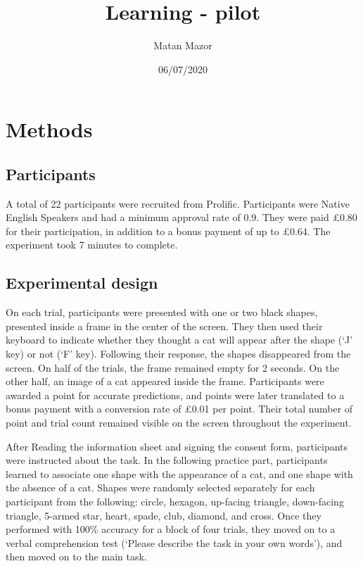 \documentclass[
]{article}
\title{Learning - pilot}
\author{Matan Mazor}
\date{06/07/2020}
\begin{document}
\maketitle

\hypertarget{methods}{%
\section{Methods}\label{methods}}

\hypertarget{participants}{%
\subsection{Participants}\label{participants}}

A total of 22 participants were recruited from Prolific. Participants
were Native English Speakers and had a minimum approval rate of 0.9.
They were paid £0.80 for their participation, in addition to a bonus
payment of up to £0.64. The experiment took 7 minutes to complete.

\hypertarget{experimental-design}{%
\subsection{Experimental design}\label{experimental-design}}

On each trial, participants were presented with one or two black shapes,
presented inside a frame in the center of the screen. They then used
their keyboard to indicate whether they thought a cat will appear after
the shape (`J' key) or not (`F' key). Following their response, the
shapes disappeared from the screen. On half of the trials, the frame
remained empty for 2 seconds. On the other half, an image of a cat
appeared inside the frame. Participants were awarded a point for
accurate predictions, and points were later translated to a bonus
payment with a conversion rate of £0.01 per point. Their total number of
point and trial count remained visible on the screen throughout the
experiment.

After Reading the information sheet and signing the consent form,
participants were instructed about the task. In the following practice
part, participants learned to associate one shape with the appearance of
a cat, and one shape with the absence of a cat. Shapes were randomly
selected separately for each participant from the following: circle,
hexagon, up-facing triangle, down-facing triangle, 5-armed star, heart,
spade, club, diamond, and cross. Once they performed with 100\% accuracy
for a block of four trials, they moved on to a verbal comprehension test
(`Please describe the task in your own words'), and then moved on to the
main task.
\end{document}
